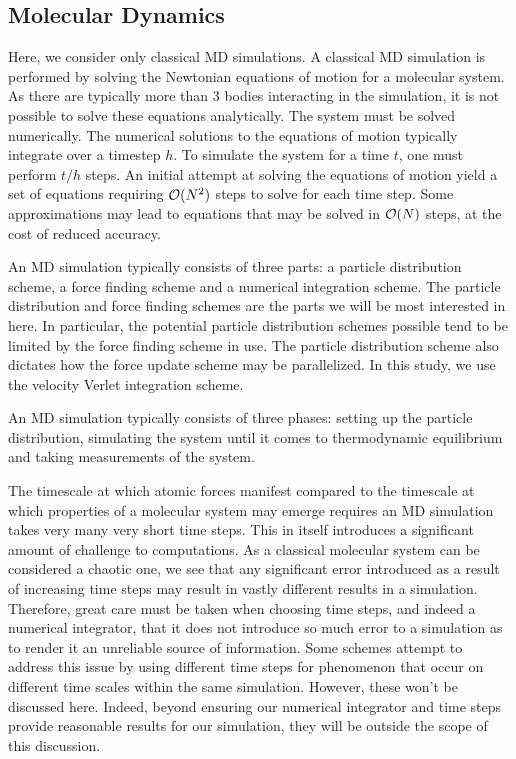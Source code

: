 %
%
\subsection{Molecular Dynamics}

Here, we consider only classical MD simulations.
%
A classical MD simulation is performed by
solving the Newtonian equations of motion for
a molecular system.
%
As there are typically more than 3 bodies interacting in the simulation,
it is not possible to solve these equations analytically.
%
The system must be solved numerically.
%
The numerical solutions to the equations of motion
typically integrate over a timestep $h$.
%
To simulate the system for a time $t$,
one must perform $t/h$ steps.
%
An initial attempt at solving the equations of motion yield
a set of equations requiring $\mathcal{O}{(N^2)}$ steps to solve
for each time step.
%
Some approximations may lead to equations that may be
solved in $\mathcal{O}{(N)}$ steps,
at the cost of reduced accuracy.

An MD simulation typically consists of three parts:
a particle distribution scheme,
a force finding scheme and
a numerical integration scheme.
%
The particle distribution and force finding schemes are
the parts we will be most interested in here.
%
In particular, the potential particle distribution schemes possible
tend to be limited by the force finding scheme in use.
%
The particle distribution scheme also dictates
how the force update scheme may be parallelized.
%
In this study, we use the velocity Verlet integration scheme.

An MD simulation typically consists of three phases:
setting up the particle distribution,
simulating the system until it comes to thermodynamic equilibrium and
taking measurements of the system.

The timescale at which atomic forces manifest compared to
the timescale at which properties of a molecular system may emerge
requires an MD simulation takes very many very short time steps.
%
This in itself introduces a significant amount of challenge to computations.
%
As a classical molecular system can be considered a chaotic one,
we see that any significant error introduced as a result of
increasing time steps may result in
vastly different results in a simulation.
%
Therefore, great care must be taken when choosing time steps, and
indeed a numerical integrator,
that it does not introduce so much error to a simulation as to render it
an unreliable source of information.
%
Some schemes attempt to address this issue by
using different time steps for phenomenon that occur on
different time scales within the same simulation.
%
However, these won’t be discussed here.
%
Indeed, beyond ensuring our numerical integrator and time steps provide
reasonable results for our simulation,
they will be outside the scope of this discussion.


